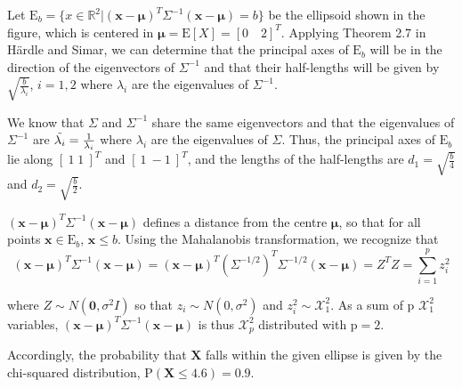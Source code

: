 Let $\text{E}_b = \{ x \in \mathbb{R}^2 | (\mathbf{x} - \mathbf{\mu})^T \Sigma^{-1}(\mathbf{x} - \mathbf{\mu}) = b \}$ be the ellipsoid shown in the figure, which is centered in $\mathbf{\mu} = \text{E}[X] = [0 \quad 2]^T$. Applying Theorem 2.7 in Härdle and Simar, we can determine that the principal axes of $\text{E}_b$ will be in the direction of the eigenvectors of $\Sigma^{-1}$ and that their half-lengths will be given by $\sqrt{\frac{b}{\lambda_i}}$, $i =1,2$ where $\lambda_i$ are the eigenvalues of $\Sigma^{-1}$.

We know that $\Sigma$ and $\Sigma^{-1}$ share the same eigenvectors and that the eigenvalues of $\Sigma^{-1}$ are  $\Tilde{\lambda_i}= \frac{1}{{\lambda_i}}$ where $\lambda_i$ are the eigenvalues of $\Sigma$. 
Thus, the principal axes of $\text{E}_b$ lie along $[\: 1 \;  1\: ]^T$ and $[\: 1 \ -1\:]^T$, and the lengths of the half-lengths are $d_1 = \sqrt{\frac{b}{4}}$ and $d_2 = \sqrt{\frac{b}{2}}$.


$(\mathbf{x}- \mathbf{\mu})^T\Sigma^{-1} (\mathbf{x}- \mathbf{\mu})$ defines a distance from the centre $\mathbf{\mu}$, so that for all points $\mathbf{x} \in \text{E}_b$, $\mathbf{x} \leq b$. 
Using the Mahalanobis transformation, we recognize that 
\begin{equation*}
    (\mathbf{x}- \mathbf{\mu})^T\Sigma^{-1} (\mathbf{x}- \mathbf{\mu})
    = (\mathbf{x}- \mathbf{\mu})^T(\Sigma^{-1/2})^T\Sigma^{-1/2}(\mathbf{x}- \mathbf{\mu}) = Z^TZ = \sum_{i=1}^p z_i^2
\end{equation*}

where $Z \sim N(\mathbf{0}, \sigma^2 I)$ so that $z_i \sim N(0,\sigma^2)$ and $z_i^2 \sim \mathcal{X}_1^2$. As a sum of p $\mathcal{X}_1^2$ variables, $(\mathbf{x}- \mathbf{\mu})^T\Sigma^{-1} (\mathbf{x}- \mathbf{\mu})$ is thus $\mathcal{X}_p^2$ distributed with $\text{p}=2$. %

Accordingly, the probability that $\mathbf{X}$ falls within the given ellipse is given by the chi-squared distribution, $\text{P}(\mathbf{X} \leq 4.6) = 0.9$.